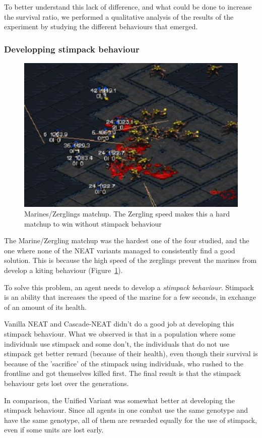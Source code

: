 To better understand this lack of difference, and what could be done
to increase the survival ratio, we performed a qualitative analysis of the
results of the experiment by studying the different behaviours that emerged.

\subsubsection{Developping stimpack behaviour}

\begin{figure}
    \includegraphics[width=.45\textwidth]{figures/marines_vs_zerglings_combat}
    \caption{Marines/Zerglings matchup. The Zergling speed makes this
      a hard matchup to win without stimpack
      behaviour}\label{fig:marines_vs_zerglings}
\end{figure}

The Marine/Zergling matchup was the hardest one of the four studied,
and the one where none of the NEAT variants managed to consistently
find a good solution. This is because the high speed of the zerglings
prevent the marines from develop a kiting behaviour
(Figure~\ref{fig:marines_vs_zerglings}).

To solve this problem, an agent needs to develop a \emph{stimpack
  behaviour}. Stimpack is an ability that increases the speed of the
marine for a few seconds, in exchange of an amount of its health. 

Vanilla NEAT and Cascade-NEAT didn't do a good job at developing this
stimpack behaviour. What we observed is that in a population where some
individuals use stimpack and some don't, the individuals that do not
use stimpack get better reward (because of their health), even though
their survival is because of the 'sacrifice' of the stimpack using
individuals, who rushed to the frontline and got themselves killed
first. The final result is that the stimpack behaviour gets lost over
the generations.

In comparison, the Unified Variant was somewhat better at developing
the stimpack behaviour. Since all agents in one combat use the same
genotype and have the same genotype, all of them are rewarded equally
for the use of stimpack, even if some units are lost early.

